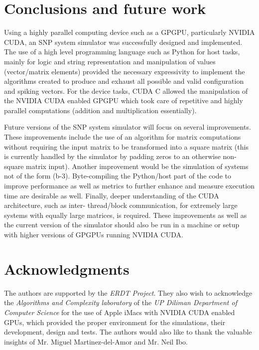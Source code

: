 \documentclass{acm_proc_article-sp}
\begin{document}
\section{Conclusions and future work}
Using a highly parallel computing device such as a GPGPU,
particularly NVIDIA CUDA, an SNP system simulator was
successfully designed and implemented. The use of a high
level programming language such as Python for host tasks,
mainly for logic and string representation and manipulation
of values (vector/matrix elements) provided the necessary
expressivity to implement the algorithms created to produce
and exhaust all possible and valid configuration and spiking
vectors. For the device tasks, CUDA C allowed the
manipulation of the NVIDIA CUDA enabled GPGPU which
took care of repetitive and highly parallel computations
(addition and multiplication essentially).

Future versions of the SNP system simulator will focus on
several improvements. These improvements include the use
of an algorithm for matrix computations without requiring
the input matrix to be transformed into a square matrix (this is
currently handled by the simulator by padding zeros to an
otherwise non-square matrix input). Another improvement
would be the simulation of systems not of the form (b-3).
Byte-compiling the Python/host part of the code to improve
performance as well as metrics to further enhance and
measure execution time are desirable as well. Finally, deeper
understanding of the CUDA architecture, such as inter-
thread/block communication, for extremely large systems
with equally large matrices, is required. These
improvements as well as the current version of the simulator
should also be run in a machine or setup with higher versions of
GPGPUs running NVIDIA CUDA.


\section{ Acknowledgments }
The authors are supported by the \textit{ERDT Project}. They also wish to acknowledge the \textit{Algorithms and Complexity laboratory} of the \textit{UP Diliman Department of Computer Science} for the use of Apple iMacs with NVIDIA CUDA enabled GPUs, which provided the proper environment for the simulations, their development, design and tests. The authors would also like to thank the valuable insights of Mr. Miguel Martinez-del-Amor and Mr. Neil Ibo.
\end{document}
